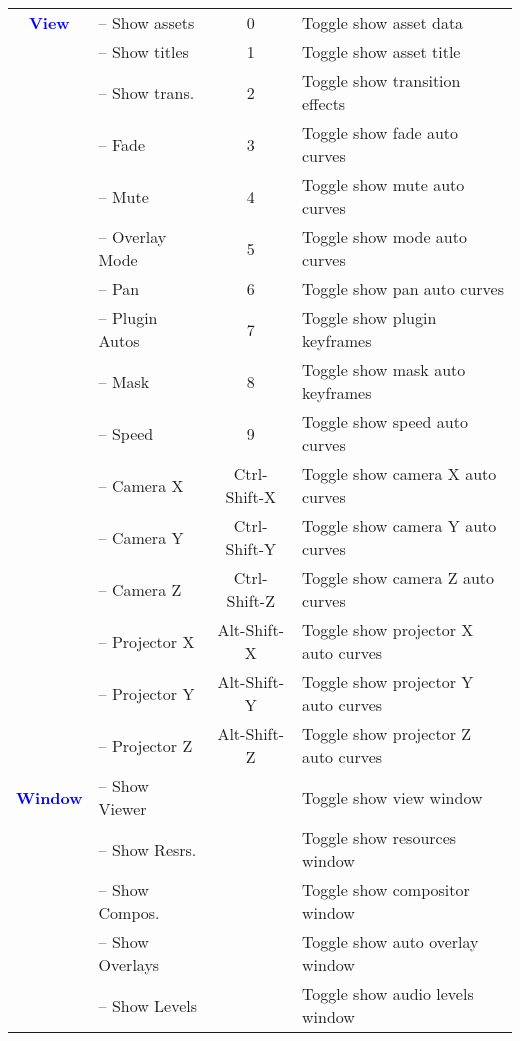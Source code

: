 \begin{center}
\begin{longtable}{>{\bfseries}c l c p{6cm}}
             \midrule
          \textcolor{blue}{View} & -- Show assets & 0 & Toggle show asset data \\             
             & -- Show titles & 1 & Toggle show asset title \\             
             & -- Show trans. & 2 & Toggle show transition effects \\             
             & -- Fade & 3 & Toggle show fade auto curves \\             
             & -- Mute & 4 & Toggle show mute auto curves \\             
             & -- Overlay Mode & 5 & Toggle show mode auto curves \\             
             & -- Pan & 6 & Toggle show pan auto curves \\             
             & -- Plugin Autos & 7 & Toggle show plugin keyframes \\             
             & -- Mask & 8 & Toggle show mask auto keyframes \\             
             & -- Speed & 9 & Toggle show speed auto curves \\             
             & -- Camera X & Ctrl-Shift-X & Toggle show camera X auto curves \\             
             & -- Camera Y & Ctrl-Shift-Y & Toggle show camera Y auto curves \\             
             & -- Camera Z & Ctrl-Shift-Z & Toggle show camera Z auto curves \\             
             & -- Projector X & Alt-Shift-X & Toggle show projector X auto curves \\             
             & -- Projector Y & Alt-Shift-Y & Toggle show projector Y auto curves \\             
             & -- Projector Z & Alt-Shift-Z & Toggle show projector Z auto curves \\
             \midrule
          \textcolor{blue}{Window} & -- Show Viewer &  & Toggle show view window \\             
             & -- Show Resrs. &  & Toggle show resources window \\             
             & -- Show Compos. &  & Toggle show compositor window \\             
             & -- Show Overlays &  & Toggle show auto overlay window \\             
             & -- Show Levels &  & Toggle show audio levels window \\             

\end{longtable}
\end{center}
